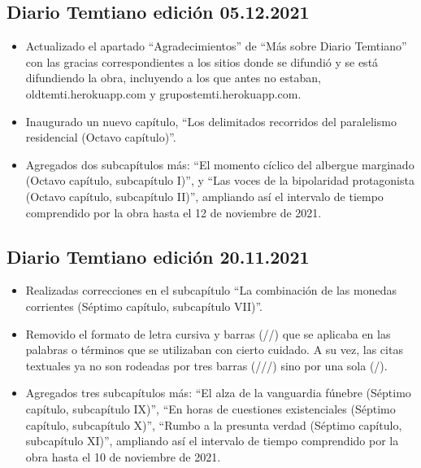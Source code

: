 \documentclass[
]{book}
\begin{document}
\hypertarget{diario-temtiano-ediciuxf3n-05.12.2021}{%
\subsection*{Diario Temtiano edición 05.12.2021}\label{diario-temtiano-ediciuxf3n-05.12.2021}}

\begin{itemize}
\item
  Actualizado el apartado ``Agradecimientos'' de ``Más sobre Diario Temtiano'' con las gracias correspondientes a los sitios donde se difundió y se está difundiendo la obra, incluyendo a los que antes no estaban, oldtemti.herokuapp.com y grupostemti.herokuapp.com.
\item
  Inaugurado un nuevo capítulo, ``Los delimitados recorridos del paralelismo residencial (Octavo capítulo)''.
\item
  Agregados dos subcapítulos más: ``El momento cíclico del albergue marginado (Octavo capítulo, subcapítulo I)'', y ``Las voces de la bipolaridad protagonista (Octavo capítulo, subcapítulo II)'', ampliando así el intervalo de tiempo comprendido por la obra hasta el 12 de noviembre de 2021.
\end{itemize}

\hypertarget{diario-temtiano-ediciuxf3n-20.11.2021}{%
\subsection*{Diario Temtiano edición 20.11.2021}\label{diario-temtiano-ediciuxf3n-20.11.2021}}

\begin{itemize}
\item
  Realizadas correcciones en el subcapítulo ``La combinación de las monedas corrientes (Séptimo capítulo, subcapítulo VII)''.
\item
  Removido el formato de letra cursiva y barras (//) que se aplicaba en las palabras o términos que se utilizaban con cierto cuidado. A su vez, las citas textuales ya no son rodeadas por tres barras (///) sino por una sola (/).
\item
  Agregados tres subcapítulos más: ``El alza de la vanguardia fúnebre (Séptimo capítulo, subcapítulo IX)'', ``En horas de cuestiones existenciales (Séptimo capítulo, subcapítulo X)'', ``Rumbo a la presunta verdad (Séptimo capítulo, subcapítulo XI)'', ampliando así el intervalo de tiempo comprendido por la obra hasta el 10 de noviembre de 2021.
\end{itemize}
\end{document}
